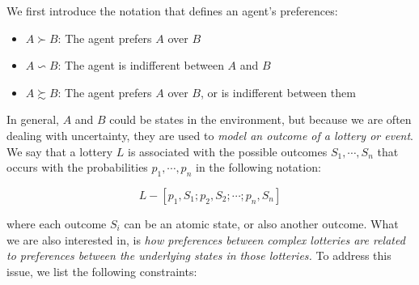 \documentclass[11pt]{article}
\begin{document}
We first introduce the notation that defines an agent's preferences:

\begin{itemize}
    \item $A \succ B$: The agent prefers $A$ over $B$
    \item $A \backsim B$: The agent is indifferent between $A$ and $B$
    \item $A \succsim B$: The agent prefers $A$ over $B$, or is indifferent between them
\end{itemize}

In general, $A$ and $B$ could be states in the environment, but because we are often dealing with uncertainty, they are used to \textit{model an outcome of a lottery or event}. We say that a lottery $L$ is associated with the possible outcomes $S_1, \cdots, S_n$ that occurs with the probabilities $p_1, \cdots, p_n$ in the following notation:

$$
L - [ p_1, S_1; p_2, S_2; \cdots; p_n, S_n]
$$

where each outcome $S_i$ can be an atomic state, or also another outcome. What we are also interested in, is \textit{how preferences between complex lotteries are related to preferences between the underlying states in those lotteries.} To address this issue, we list the following constraints:
\end{document}

